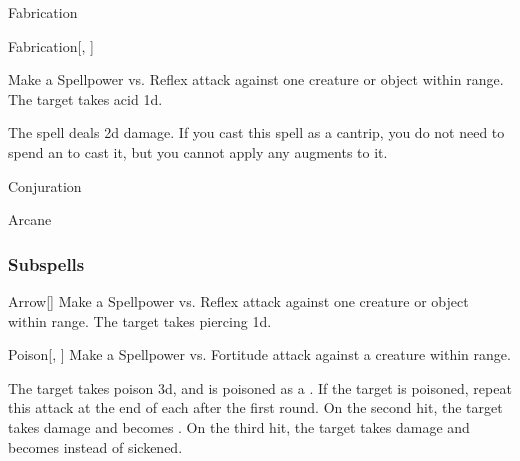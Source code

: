 \newpage
\begin{spellsection}{Fabrication}

\begin{spellheader}
\end{spellheader}


\begin{ability}{Fabrication}[, ]

Make a Spellpower vs. Reflex attack against one creature or object within \rngmed range.
\hit The target takes acid  \plus1d.

\end{ability}



 The spell deals \minus2d damage. If you cast this spell as a cantrip,
you do not need to spend an  to cast it,
but you cannot apply any augments to it.


 Conjuration

 Arcane
\end{spellsection}


\subsubsection{Subspells}


\begin{ability}[\nth{2}]{Arrow}[]
Make a Spellpower vs. Reflex attack against one creature or object within \rnglong range.
\hit The target takes piercing  \plus1d.
\end{ability}
\vspace{0.25em}


\begin{ability}[\nth{2}]{Poison}[, ]
Make a Spellpower vs. Fortitude attack against a creature within \rngmed range.

\hit The target takes poison  \minus3d, and is poisoned as a .
If the target is poisoned, repeat this attack at the end of each  after the first round.
On the second hit, the target takes damage and becomes .
On the third hit, the target takes damage and becomes  instead of sickened.
\end{ability}
\vspace{0.25em}


